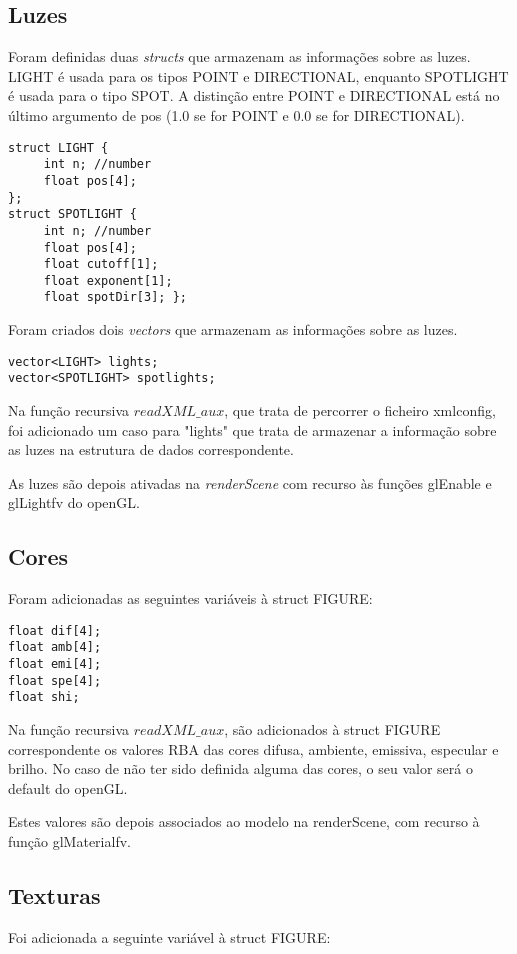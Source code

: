 \documentclass[11pt,a4paper]{report}
\begin{document}
\subsection{Luzes}
Foram definidas duas \emph{structs} que armazenam as informações sobre as luzes. LIGHT é usada para os tipos POINT e DIRECTIONAL, enquanto SPOTLIGHT é usada para o tipo SPOT. A distinção entre POINT e DIRECTIONAL está no último argumento de pos (1.0 se for POINT e 0.0 se for DIRECTIONAL).

\begin{lstlisting}[style = code]
struct LIGHT {
	 int n; //number
	 float pos[4];
};
struct SPOTLIGHT {
	 int n; //number
	 float pos[4];
	 float cutoff[1];
	 float exponent[1];
	 float spotDir[3]; };
\end{lstlisting}

Foram criados dois \emph{vectors} que armazenam as informações sobre as luzes.

\begin{lstlisting}[style = code]
vector<LIGHT> lights;
vector<SPOTLIGHT> spotlights;
\end{lstlisting}

Na função recursiva {$readXML\_aux$}, que trata de percorrer o ficheiro xmlconfig, foi adicionado um caso para "lights" que trata de armazenar a informação sobre as luzes na estrutura de dados correspondente.

As luzes são depois ativadas na \emph{renderScene} com recurso às funções glEnable e glLightfv do openGL.

\subsection{Cores}
Foram adicionadas as seguintes variáveis à struct FIGURE:
\begin{lstlisting}[style = code]
float dif[4];
float amb[4];
float emi[4];
float spe[4];
float shi;
\end{lstlisting}

Na função recursiva {$readXML\_aux$}, são adicionados à struct FIGURE correspondente os valores RBA das cores difusa, ambiente, emissiva, especular e brilho.
No caso de não ter sido definida alguma das cores, o seu valor será o default do openGL.

Estes valores são depois associados ao modelo na renderScene, com recurso à função glMaterialfv.

\subsection{Texturas}
Foi adicionada a seguinte variável à struct FIGURE:
\end{document}
